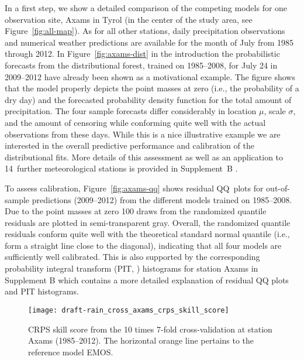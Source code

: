 \documentclass[aoas, preprint]{imsart}
\numberwithin{equation}{subsection}
\begin{document}
In a first step, we show a detailed comparison of the competing models
for one observation site, Axams in Tyrol (in the center of the study area,
see Figure~\ref{fig:all-map}). As for all other stations, daily precipitation 
observations and numerical weather predictions are available for the month of July 
from 1985 through 2012. In Figure~\ref{fig:axams-dist} in the introduction the 
probabilistic forecasts from the distributional forest, trained on 1985--2008, 
for July 24 in 2009--2012 have already been shown as a motivational example. 
The figure shows that the model properly depicts the point masses at zero 
(i.e., the probability of a dry day) and the forecasted probability density 
function for the total amount of precipitation. The four sample forecasts differ 
considerably in location $\mu$, scale $\sigma$, and the amount of
censoring while conforming quite well with the actual observations
from these days. While this is a nice illustrative example we are  
interested in the overall predictive performance and calibration of the
distributional fits. More details of this assessment as well as
an application to 14~further meteorological stations is provided in
Supplement~B \citep{Schlosser+Hothorn+Stauffer:2018b}.

To assess calibration, Figure~\ref{fig:axams-qq} shows residual QQ~plots for
out-of-sample predictions (2009--2012) from the different models trained on
1985--2008. Due to the point masses at zero 100 draws from the randomized
quantile residuals \citep{Dunn+Smyth:1996} are plotted in semi-transparent
gray. Overall, the randomized quantile residuals conform quite well with the
theoretical standard normal quantile (i.e., form a straight line close to the 
diagonal), indicating that all four models are sufficiently well calibrated. 
This is also supported by the corresponding probability integral transform
(PIT, \citealp{Gneiting+Balabdaoui+Raftery:2007}) histograms for station
Axams in Supplement B \citep{Schlosser+Hothorn+Stauffer:2018b} which 
contains a more detailed explanation of residual QQ plots and PIT histograms.


\begin{figure}[t!]
\centering
{}
\texttt{[image: draft-rain\_cross\_axams\_crps\_skill\_score]}
\caption{\label{fig:axams-crps}CRPS skill score from the 10 times 
7-fold cross-validation at station Axams (1985--2012). The horizontal orange 
line pertains to the reference model EMOS.}
\end{figure}
\end{document}
